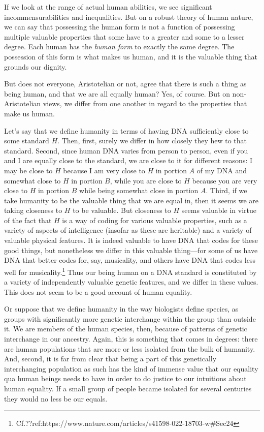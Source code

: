 If we look at the range of actual human abilities, we see significant incommensurabilities and inequalities. But on a robust theory of human nature, we can say that possessing the human form is not a function of possessing multiple valuable properties that some have to a 
greater and some to a lesser degree. Each human has the \textit{human form} to exactly the same degree. The 
possession of this form is what makes us human, and it is the valuable thing that grounds our dignity. 

But does not everyone, Aristotelian or not, agree that there is such a thing as being human, and that we are all 
equally human? Yes, of course. But on non-Aristotelian views, we differ from one another in regard to the properties
that make us human. 

Let's say that we define humanity in terms of having DNA sufficiently close to some standard $H$.
Then, first, surely we differ in how closely they hew to that standard. Second, since human DNA varies from
person to person, even if you and I are equally close to the
standard, we are close to it for different reasons: I may be close to $H$ because I am very close to $H$ in portion $A$ of
my DNA and somewhat close to $H$ in portion $B$, while you are close to $H$ because you are very close to $H$ in portion
$B$ while being somewhat close in portion $A$. Third, if we take humanity to be the valuable thing that we are equal in,
then it seems we are taking closeness to $H$ to be valuable. But closeness to $H$ seems valuable in virtue of the fact
that $H$ is a way of coding for various valuable properties, such as a variety of aspects of intelligence (insofar as these
are heritable) and a variety of valuable physical features. It is indeed valuable to have DNA that codes for these good
things, but nonetheless we differ in this valuable thing---for some of us have DNA that better codes for, say, musicality, and others have DNA that codes less well for musicality.\footnote{Cf.??ref:https://www.nature.com/articles/s41598-022-18703-w#Sec24} Thus our being human on a DNA standard is constituted by a variety of independently valuable genetic features,
and we differ in these values. This does not seem to be a good account of human equality.

Or suppose that we define humanity in the way biologists define species, as groups with significantly more genetic interchange
within the group than outside it. We are members of the human species, then, because of patterns of genetic interchange in our
ancestry. Again, this is something that comes in degrees: there are human populations that are more or less isolated from the 
bulk of humanity. And, second, it is far from clear that being a part of this genetically interchanging population as such
has the kind of immense value that our equality qua human beings needs to have in order to do justice to our intuitions about
human equality. If a small group of people became isolated for several centuries they would no less be our equals.

